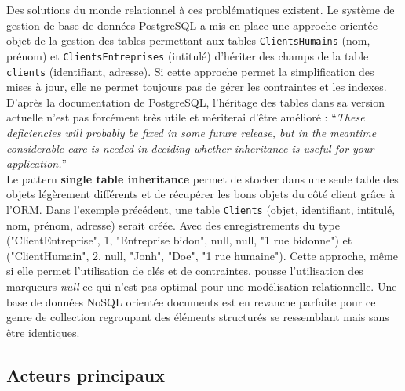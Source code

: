 	\vspace{10px}

	Des solutions du monde relationnel à ces problématiques existent. Le système de gestion de base de données PostgreSQL a mis en place une approche orientée objet de la gestion des tables permettant aux tables \texttt{ClientsHumains} (nom, prénom) et \texttt{ClientsEntreprises} (intitulé) d'hériter des champs de la table \texttt{clients} (identifiant, adresse). Si cette approche permet la simplification des mises à jour, elle ne permet toujours pas de gérer les contraintes et les indexes. D'après la documentation de PostgreSQL, l'héritage des tables dans sa version actuelle n'est pas forcément très utile et mériterai d'être amélioré :
	\enquote{\textit{These deficiencies will probably be fixed in some future release, but in the meantime considerable care is needed in deciding whether inheritance is useful for your application.}}\cite{Postgre_inheritance}\\

	Le pattern \textbf{single table inheritance} permet de stocker dans une seule table des objets légèrement différents et de récupérer les bons objets du côté client grâce à l'ORM. Dans l'exemple précédent, une table \texttt{Clients} (objet, identifiant, intitulé, nom, prénom, adresse) serait créée. Avec des enregistrements du type ("ClientEntreprise", 1, "Entreprise bidon", null, null, "1 rue bidonne") et ("ClientHumain", 2, null, "Jonh", "Doe", "1 rue humaine"). Cette approche, même si elle permet l'utilisation de clés et de contraintes, pousse l'utilisation des marqueurs \textit{null} ce qui n'est pas optimal pour une modélisation relationnelle. Une base de données NoSQL orientée documents est en revanche parfaite pour ce genre de collection regroupant des éléments structurés se ressemblant mais sans être identiques.

\subsection{Acteurs principaux}

